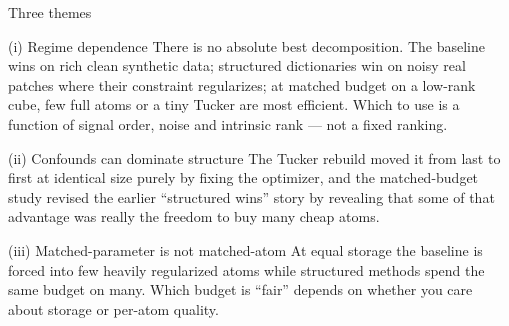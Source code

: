 \documentclass[aspectratio=169,9pt]{beamer}
\begin{document}
\begin{frame}{Three themes}
\begin{block}{(i) Regime dependence}
\small There is no absolute best decomposition. The baseline wins on rich clean
synthetic data; structured dictionaries win on noisy real patches where their
constraint regularizes; at matched budget on a low-rank cube, few full atoms or a
tiny Tucker are most efficient. Which to use is a function of signal order, noise
and intrinsic rank --- not a fixed ranking.
\end{block}
\begin{block}{(ii) Confounds can dominate structure}
\small The Tucker rebuild moved it from last to first at identical size purely by
fixing the optimizer, and the matched-budget study revised the earlier
``structured wins'' story by revealing that some of that advantage was really the
freedom to buy many cheap atoms.
\end{block}
\begin{block}{(iii) Matched-parameter is not matched-atom}
\small At equal storage the baseline is forced into few heavily regularized atoms
while structured methods spend the same budget on many. Which budget is ``fair''
depends on whether you care about storage or per-atom quality.
\end{block}
\end{frame}
\end{document}
